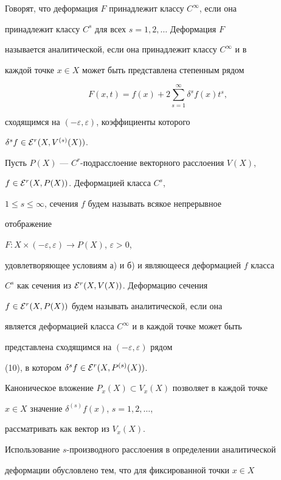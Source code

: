 Говорят, что деформация $F$ принадлежит классу $C^{\infty}$, если она


принадлежит классу $C^s$ для всех $s= 1,2,\dotsc$ Деформация $F$


называется аналитической, если она принадлежит классу $C^{\infty}$ и в


каждой точке $x\in X$ может быть представлена степенным рядом


\begin{equation}


F(x,t)=f(x)+2\sum_{s=1}^{\infty}\delta^sf(x)t^s,


\end{equation}


сходящимся на $(-\varepsilon,\varepsilon)$, коэффициенты которого


$\delta^sf\in {\cal E}^r(X,V^{(s)}(X))$.





Пусть $P(X)$ --- $C^r$-подрасслоение векторного расслоения $V(X)$,


$f\in{\cal E}^r(X,P(X))$. Деформацией класса $C^s$,


$1\le s\le \infty$, сечения $f$ будем называть всякое непрерывное


отображение


$F: X\times (-\varepsilon,\varepsilon)\to P(X)$, $\varepsilon> 0$,


удовлетворяющее условиям а) и б) и являющееся деформацией $f$ класса


$C^s$ как сечения из ${\cal E}^r(X,V(X))$. Деформацию сечения


$f\in{\cal E}^r(X,P(X))$ будем называть аналитической, если она


является деформацией класса $C^{\infty}$ и в каждой точке может быть


представлена сходящимся на $(-\varepsilon,\varepsilon)$ рядом


(10), в котором $\delta^sf\in {\cal E}^r(X,P^{(s)}(X))$.


Каноническое вложение $P_x(X)\subset V_x(X)$ позволяет в каждой точке


$x\in X$ значение $\delta^{(s)}f(x)$, $s=1,2,\dotsc$,


рассматривать как вектор из $V_x(X)$.





Использование $s$-производного расслоения в определении аналитической


деформации обусловлено тем, что для фиксированной точки $x\in X$


